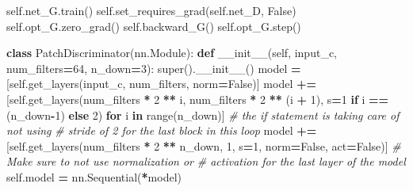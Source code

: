 \documentclass[
]{article}
\newenvironment{Shaded}{\begin{snugshade}}{\end{snugshade}}
\newcommand{\BuiltInTok}[1]{#1}
\newcommand{\CommentTok}[1]{\textcolor[rgb]{0.56,0.35,0.01}{\textit{#1}}}
\newcommand{\ControlFlowTok}[1]{\textcolor[rgb]{0.13,0.29,0.53}{\textbf{#1}}}
\newcommand{\DecValTok}[1]{\textcolor[rgb]{0.00,0.00,0.81}{#1}}
\newcommand{\FunctionTok}[1]{\textcolor[rgb]{0.00,0.00,0.00}{#1}}
\newcommand{\KeywordTok}[1]{\textcolor[rgb]{0.13,0.29,0.53}{\textbf{#1}}}
\newcommand{\NormalTok}[1]{#1}
\newcommand{\OperatorTok}[1]{\textcolor[rgb]{0.81,0.36,0.00}{\textbf{#1}}}
\newcommand{\VariableTok}[1]{\textcolor[rgb]{0.00,0.00,0.00}{#1}}
\begin{document}
\begin{Shaded}
\begin{Highlighting}[]
        \VariableTok{self}\NormalTok{.net\_G.train()}
        \VariableTok{self}\NormalTok{.set\_requires\_grad(}\VariableTok{self}\NormalTok{.net\_D, }\VariableTok{False}\NormalTok{)}
        \VariableTok{self}\NormalTok{.opt\_G.zero\_grad()}
        \VariableTok{self}\NormalTok{.backward\_G()}
        \VariableTok{self}\NormalTok{.opt\_G.step()}
\end{Highlighting}
\end{Shaded}

\begin{Shaded}
\begin{Highlighting}[]
\KeywordTok{class}\NormalTok{ PatchDiscriminator(nn.Module):}
    \KeywordTok{def} \FunctionTok{\_\_init\_\_}\NormalTok{(}\VariableTok{self}\NormalTok{, input\_c, num\_filters}\OperatorTok{=}\DecValTok{64}\NormalTok{, n\_down}\OperatorTok{=}\DecValTok{3}\NormalTok{):}
        \BuiltInTok{super}\NormalTok{().}\FunctionTok{\_\_init\_\_}\NormalTok{()}
\NormalTok{        model }\OperatorTok{=}\NormalTok{ [}\VariableTok{self}\NormalTok{.get\_layers(input\_c, num\_filters, norm}\OperatorTok{=}\VariableTok{False}\NormalTok{)]}
\NormalTok{        model }\OperatorTok{+=}\NormalTok{ [}\VariableTok{self}\NormalTok{.get\_layers(num\_filters }\OperatorTok{*} \DecValTok{2} \OperatorTok{**}\NormalTok{ i, num\_filters }\OperatorTok{*} \DecValTok{2} \OperatorTok{**}\NormalTok{ (i }\OperatorTok{+} \DecValTok{1}\NormalTok{), s}\OperatorTok{=}\DecValTok{1} \ControlFlowTok{if}\NormalTok{ i }\OperatorTok{==}\NormalTok{ (n\_down}\OperatorTok{{-}}\DecValTok{1}\NormalTok{) }\ControlFlowTok{else} \DecValTok{2}\NormalTok{) }
                          \ControlFlowTok{for}\NormalTok{ i }\KeywordTok{in} \BuiltInTok{range}\NormalTok{(n\_down)] }\CommentTok{\# the \textquotesingle{}if\textquotesingle{} statement is taking care of not using}
                                                  \CommentTok{\# stride of 2 for the last block in this loop}
\NormalTok{        model }\OperatorTok{+=}\NormalTok{ [}\VariableTok{self}\NormalTok{.get\_layers(num\_filters }\OperatorTok{*} \DecValTok{2} \OperatorTok{**}\NormalTok{ n\_down, }\DecValTok{1}\NormalTok{, s}\OperatorTok{=}\DecValTok{1}\NormalTok{, norm}\OperatorTok{=}\VariableTok{False}\NormalTok{, act}\OperatorTok{=}\VariableTok{False}\NormalTok{)] }\CommentTok{\# Make sure to not use normalization or}
                                                                                             \CommentTok{\# activation for the last layer of the model}
        \VariableTok{self}\NormalTok{.model }\OperatorTok{=}\NormalTok{ nn.Sequential(}\OperatorTok{*}\NormalTok{model)                                                   }
        

\end{Highlighting}
\end{Shaded}
\end{document}
